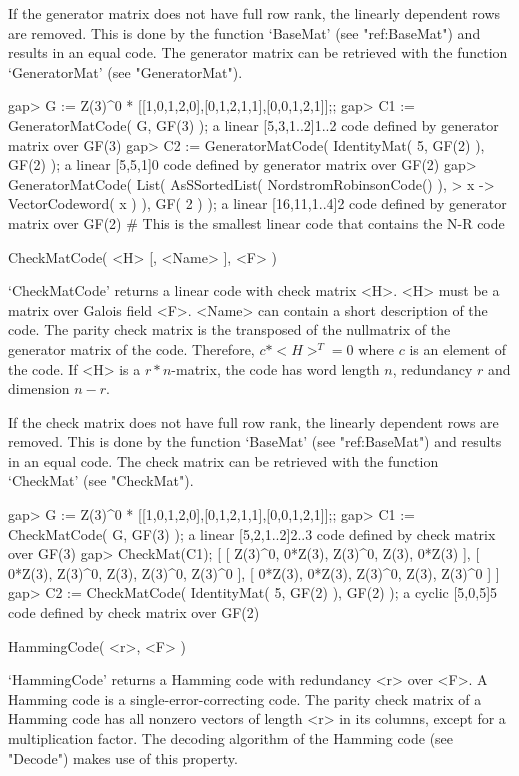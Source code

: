 If the   generator  matrix does  not  have  full row   rank, the linearly
dependent rows  are removed. This is  done by the function `BaseMat' (see
"ref:BaseMat")  and results  in an equal  code. The  generator  matrix can be
retrieved with the function `GeneratorMat' (see "GeneratorMat").

\beginexample
gap> G := Z(3)^0 * [[1,0,1,2,0],[0,1,2,1,1],[0,0,1,2,1]];;
gap> C1 := GeneratorMatCode( G, GF(3) );
a linear [5,3,1..2]1..2 code defined by generator matrix over GF(3)
gap> C2 := GeneratorMatCode( IdentityMat( 5, GF(2) ), GF(2) );
a linear [5,5,1]0 code defined by generator matrix over GF(2)
gap> GeneratorMatCode( List( AsSSortedList( NordstromRobinsonCode() ),
> x -> VectorCodeword( x ) ), GF( 2 ) );
a linear [16,11,1..4]2 code defined by generator matrix over GF(2)
# This is the smallest linear code that contains the N-R code 
\endexample

\>CheckMatCode( <H> [, <Name> ], <F> )

`CheckMatCode' returns a linear code with check matrix <H>. <H> must be a
matrix over  Galois field <F>. <Name> can  contain a short description of
the code. The parity check matrix is  the transposed of the nullmatrix of
the generator matrix of the code. Therefore, $c*<H>^T =  0$ where $c$ is
an  element of the code.  If <H>  is a $r*n$-matrix,   the code has word
length $n$, redundancy $r$ and dimension $n-r$.

If the  check matrix does not have  full row rank, the linearly dependent
rows are removed. This is done  by the function `BaseMat' (see "ref:BaseMat")
and results in an equal code. The check matrix  can be retrieved with the
function `CheckMat' (see "CheckMat").

\beginexample
gap> G := Z(3)^0 * [[1,0,1,2,0],[0,1,2,1,1],[0,0,1,2,1]];;
gap> C1 := CheckMatCode( G, GF(3) );
a linear [5,2,1..2]2..3 code defined by check matrix over GF(3)
gap> CheckMat(C1);
[ [ Z(3)^0, 0*Z(3), Z(3)^0, Z(3), 0*Z(3) ],
  [ 0*Z(3), Z(3)^0, Z(3), Z(3)^0, Z(3)^0 ],
  [ 0*Z(3), 0*Z(3), Z(3)^0, Z(3), Z(3)^0 ] ]
gap> C2 := CheckMatCode( IdentityMat( 5, GF(2) ), GF(2) );
a cyclic [5,0,5]5 code defined by check matrix over GF(2)
\endexample

\>HammingCode( <r>, <F> )

`HammingCode'  returns a Hamming  code with  redundancy <r>  over <F>.  A
Hamming code is a single-error-correcting  code. The parity check  matrix
of a Hamming code  has all nonzero vectors  of length <r> in its columns,
except for a multiplication factor. The decoding algorithm of the Hamming
code (see "Decode") makes use of this property.

